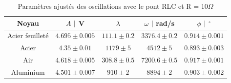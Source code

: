 \documentclass[preview]{standalone}
\begin{document}
%
%
%
%
%
%
\begin{table}[h!]
\centering
\label{tab:fits}
\renewcommand{\arraystretch}{1.2}
\begin{tabular}{|c|c|c|c|c|}
\hline
Noyau & $A$ | V & $\lambda$ & $\omega$ | rad/s & $\phi$ | $^\circ$ \\
\hline
Acier feuilleté     &
$4.695 \pm 0.005$ & 
$111.1 \pm 0.2$ &
$3376.4 \pm 0.2$ &
$0.914 \pm 0.001$ \\

Acier     &
$4.35 \pm 0.01$ &
$1179 \pm 5$ &
$4512 \pm 5$ &
$0.893 \pm 0.003$ \\

Air     &
$4.618 \pm 0.005$ &
$308.8 \pm 0.5$ &
$7200.6 \pm 0.5$ &
$0.917 \pm 0.001$ \\

Aluminium     &
$4.501 \pm 0.007$ &
$910 \pm 2$ &
$8894 \pm 2$ &
$0.903 \pm 0.002$ \\
\hline
\end{tabular}
        \caption{Paramètres ajustés des oscillations avec le pont RLC et R = $10 \Omega$ }
\end{table}
\end{document}
